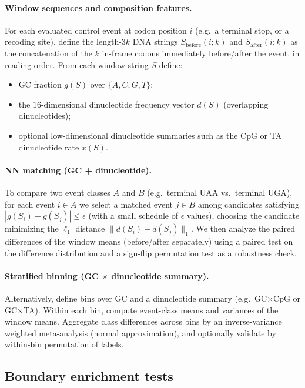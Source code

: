 \paragraph{Window sequences and composition features.}
For each evaluated control event at codon position $i$ (e.g.\ a terminal stop, or a recoding site), define the length-$3k$ DNA strings
$S_{\mathrm{before}}(i;k)$ and $S_{\mathrm{after}}(i;k)$ as the concatenation of the $k$ in-frame codons immediately before/after the event, in reading order.
From each window string $S$ define:
\begin{itemize}
\item GC fraction $g(S)$ over $\{A,C,G,T\}$;
\item the $16$-dimensional dinucleotide frequency vector $d(S)$ (overlapping dinucleotides);
\item optional low-dimensional dinucleotide summaries such as the CpG or TA dinucleotide rate $x(S)$.
\end{itemize}

\paragraph{NN matching (GC + dinucleotide).}
To compare two event classes $A$ and $B$ (e.g.\ terminal $\mathrm{UAA}$ vs.\ terminal $\mathrm{UGA}$), for each event $i\in A$ we select a matched event
$j\in B$ among candidates satisfying $|g(S_i)-g(S_j)|\le \epsilon$ (with a small schedule of $\epsilon$ values), choosing the candidate minimizing the $\ell_1$ distance
$\|d(S_i)-d(S_j)\|_1$.
We then analyze the paired differences of the window means (before/after separately) using a paired test on the difference distribution and a sign-flip permutation test as a robustness check.

\paragraph{Stratified binning (GC $\times$ dinucleotide summary).}
Alternatively, define bins over GC and a dinucleotide summary (e.g.\ GC$\times$CpG or GC$\times$TA).
Within each bin, compute event-class means and variances of the window means.
Aggregate class differences across bins by an inverse-variance weighted meta-analysis (normal approximation), and optionally validate by within-bin permutation of labels.

\subsection{Boundary enrichment tests}
\label{app:boundary_enrichment}

